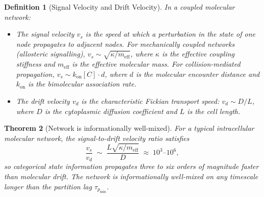 \documentclass[twocolumn,10pt,a4paper]{article}
\newcommand{\taup}{\tau_p}
\newtheorem{theorem}{Theorem}[section]
\newtheorem{definition}[theorem]{Definition}
\begin{document}
\begin{definition}[Signal Velocity and Drift Velocity]
\label{def:velocities}
In a coupled molecular network:
\begin{itemize}[noitemsep]
  \item The \emph{signal velocity} $v_s$ is the speed at which a perturbation
        in the state of one node propagates to adjacent nodes.  For
        mechanically coupled networks (allosteric signalling), $v_s\sim
        \sqrt{\kappa/m_{\mathrm{eff}}}$, where $\kappa$ is the effective
        coupling stiffness and $m_{\mathrm{eff}}$ is the effective molecular
        mass.  For collision-mediated propagation,
        $v_s\sim k_{\mathrm{on}}[C]\cdot d$, where $d$ is the molecular
        encounter distance and $k_{\mathrm{on}}$ is the bimolecular
        association rate.
  \item The \emph{drift velocity} $v_d$ is the characteristic Fickian
        transport speed: $v_d\sim D/L$, where $D$ is the cytoplasmic
        diffusion coefficient and $L$ is the cell length.
\end{itemize}
\end{definition}

\begin{theorem}[Network is informationally well-mixed]
\label{thm:well-mixed}
For a typical intracellular molecular network, the signal-to-drift velocity
ratio satisfies
\begin{equation}
  \frac{v_s}{v_d} \;\sim\; \frac{L\sqrt{\kappa/m_{\mathrm{eff}}}}{D}
    \;\approx\; 10^3\text{--}10^6,
  \label{eq:velocity-ratio}
\end{equation}
so categorical state information propagates three to six orders of magnitude
faster than molecular drift.  The network is informationally well-mixed on
any timescale longer than the partition lag $\taup_{\min}$.
\end{theorem}
\end{document}
